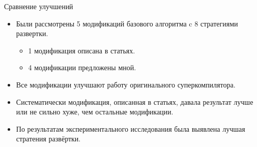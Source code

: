 \documentclass[xcolor=table]{beamer}
\begin{document}
%
\begin{frame}{Сравнение улучшений}

\begin{itemize}
\item Были рассмотрены 5 модификаций базового алгоритма
      c 8 стратегиями развертки.
      \begin{itemize}
      \item 1 модификация описана в статьях.
      \item 4 модификации предложены мной.
      \end{itemize}
\item Все модификации улучшают работу оригинального суперкомпилятора.
\item Систематически модификация, описанная в статьях, давала
      результат лучше или не сильно хуже, чем остальные модификации.
\item По результатам экспериментального исследования была выявлена
      лучшая стратения развёртки.
\end{itemize}

\end{frame}
%
\end{document}
